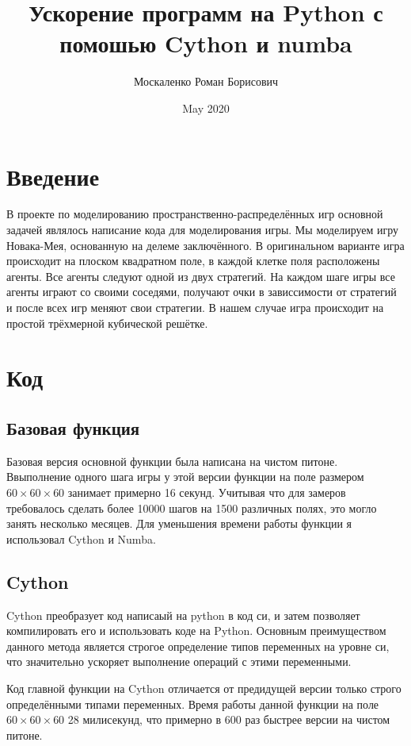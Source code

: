 \documentclass[a4paper,12pt]{article}
\title{Ускорение программ на Python с помошью Cython и numba}
\author{Москаленко Роман Борисович}
\date{May 2020}
\begin{document}
\maketitle

\section{Введение}

В проекте по моделированию пространственно-распределённых игр основной задачей являлось написание кода для моделирования игры. Мы моделируем игру Новака-Мея, основанную на делеме заключённого. В оригинальном варианте игра происходит на плоском квадратном поле, в каждой клетке поля расположены агенты. Все  агенты следуют одной из двух стратегий. На каждом шаге игры все агенты играют со своими соседями, получают очки в зависсимости от стратегий и после всех игр меняют свои стратегии. В нашем случае игра происходит на простой трёхмерной кубической решётке.

\section{Код}

\subsection{Базовая функция}

Базовая версия основной функции была написана на чистом питоне. Ввыполнение одного шага игры у этой версии функции на поле размером $60\times60\times60$ занимает примерно 16 секунд. Учитывая что для замеров требовалось сделать более 10000 шагов на 1500 различных полях, это могло занять несколько месяцев. Для уменьшения времени работы функции я использовал Cython и Numba.

\subsection{Cython}

Cython преобразует код написаый на python в код си, и затем позволяет компилировать его и использовать коде на Python. Основным преимуществом данного метода является строгое определение типов переменных на уровне си, что значительно ускоряет выполнение операций с этими переменными.

Код главной функции на Cython отличается от предидущей версии только строго определёнными типами переменных. Время работы данной функции на поле $60\times60\times60$ 28 милисекунд, что примерно в 600 раз быстрее версии на чистом питоне. 
\end{document}
